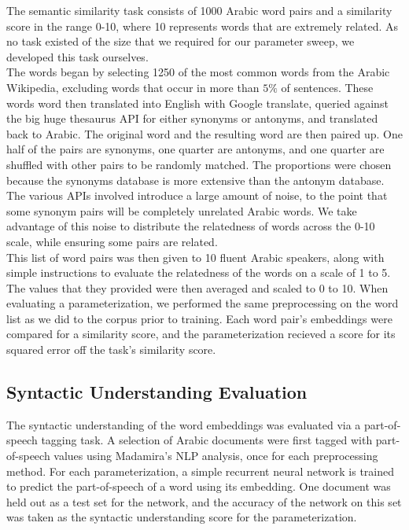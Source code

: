 The semantic similarity task consists of 1000 Arabic word pairs and a similarity score in the range 0-10, where 10 represents words that are extremely related. As no task existed of the size that we required for our parameter sweep, we developed this task ourselves. 
\\
The words began by selecting 1250 of the most common words from the Arabic Wikipedia, excluding words that occur in more than $5\%$ of sentences. These words word then translated into English with Google translate, queried against the big huge thesaurus API for either synonyms or antonyms, and translated back to Arabic. The original word and the resulting word are then paired up. One half of the pairs are synonyms, one quarter are antonyms, and one quarter are shuffled with other pairs to be randomly matched. The proportions were chosen because the synonyms database is more extensive than the antonym database. The various APIs involved introduce a large amount of noise, to the point that some synonym pairs will be completely unrelated Arabic words. We take advantage of this noise to distribute the relatedness of words across the 0-10 scale, while ensuring some pairs are related.
\\
This list of word pairs was then given to 10 fluent Arabic speakers, along with simple instructions to evaluate the relatedness of the words on a scale of 1 to 5. The values that they provided were then averaged and scaled to 0 to 10. When evaluating a parameterization, we performed the same preprocessing on the word list as we did to the corpus prior to training. Each word pair's embeddings were compared for a similarity score, and the parameterization recieved a score for its squared error off the task's similarity score.

\subsection{Syntactic Understanding Evaluation}

The syntactic understanding of the word embeddings was evaluated via a part-of-speech tagging task. A selection of Arabic documents were first tagged with part-of-speech values using Madamira's NLP analysis, once for each preprocessing method. For each parameterization, a simple recurrent neural network is trained to predict the part-of-speech of a word using its embedding. One document was held out as a test set for the network, and the accuracy of the network on this set was taken as the syntactic understanding score for the parameterization.

